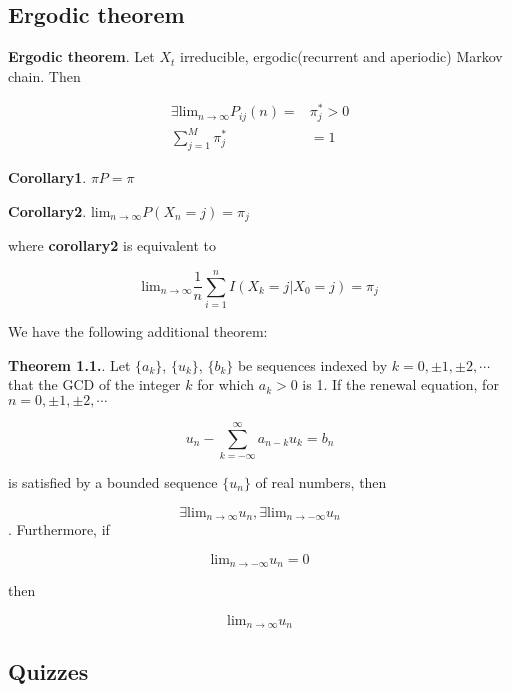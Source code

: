 \documentclass[12pt]{article}
\theoremstyle{nonumberbreak}
\begin{document}
\subsection{Ergodic theorem}

\begin{theorem}
\textbf{Ergodic theorem}. Let $X_t$ irreducible, ergodic(recurrent and aperiodic) Markov chain. Then

$$
\begin{aligned}
\exists \mathrm{lim}_{n\to\infty} P_{ij}(n) =& \pi_j^\ast > 0 \\[8pt]
\sum_{j=1}^M \pi_j^\ast &= 1
\end{aligned}
$$
\end{theorem}



\begin{theorem}
\textbf{Corollary1}. $\pi P = \pi$

\textbf{Corollary2}. $\mathrm{lim}_{n\to\infty} P(X_n = j) = \pi_j$

\end{theorem}

where \textbf{corollary2} is equivalent to 

$$
\mathrm{lim}_{n\to\infty} \frac{1}{n}\sum_{i=1}^n I(X_k=j | X_0=j) = \pi_j
$$


We have the following additional theorem:


\begin{theorem}
\textbf{Theorem 1.1.}. Let $\{a_k \}$, $\{u_k \}$, $\{b_k \}$ be sequences indexed by $k=0, \pm 1, \pm 2, \cdots$ that the GCD of the integer $k$ for which $a_k >0$ is 1. If the renewal equation, for $n = 0, \pm 1, \pm 2, \cdots$

$$
u_n - \sum_{k=-\infty}^\infty a_{n-k} u_k = b_n
$$

is satisfied by a bounded sequence $\{ u_n\}$ of real numbers, then 

$$
\exists \mathrm{lim}_{n\to \infty} u_n, \exists \mathrm{lim}_{n\to -\infty} u_n
$$. Furthermore, if

$$
\mathrm{lim}_{n\to - \infty} u_n = 0
$$

then 

$$
\mathrm{lim}_{n\to \infty} u_n
$$

\end{theorem}





\subsection*{Quizzes}
\end{document}
